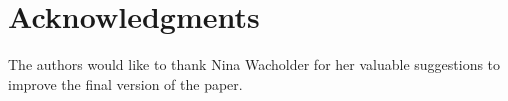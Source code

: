\documentclass[11pt]{article}
\begin{document}
 
\section*{Acknowledgments}
The authors would like to thank Nina Wacholder for her  valuable suggestions to improve the final version of the paper.



\end{document}
